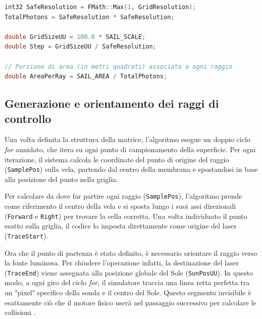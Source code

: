 \begin{lstlisting}[language=C++, caption={Impostazione della griglia di campionamento in \texttt{SolarSail.cpp}.}]
int32 SafeResolution = FMath::Max(1, GridResolution);
TotalPhotons = SafeResolution * SafeResolution;

double GridSizeUU = 100.0 * SAIL_SCALE; 
double Step = GridSizeUU / SafeResolution;

// Porzione di area (in metri quadrati) associata a ogni raggio
double AreaPerRay = SAIL_AREA / TotalPhotons;
\end{lstlisting}


\subsection{Generazione e orientamento dei raggi di controllo}

Una volta definita la struttura della matrice, l'algoritmo esegue un doppio ciclo \textit{for} annidato, che itera su ogni punto di campionamento della superficie. Per ogni iterazione, il sistema calcola le coordinate del punto di origine del raggio (\lstinline|SamplePos|) sulla vela, partendo dal centro della membrana e spostandosi in base alla posizione del punto nella griglia.

Per calcolare da dove far partire ogni raggio (\lstinline|SamplePos|), l'algoritmo prende come riferimento il centro della vela e si sposta lungo i suoi assi direzionali (\lstinline|Forward| e \lstinline|Right|) per trovare la cella corretta. Una volta individuato il punto esatto sulla griglia, il codice lo imposta direttamente come origine del laser (\lstinline|TraceStart|).

Ora che il punto di partenza è stato definito, è necessario orientare il raggio verso la fonte luminosa. Per chiudere l'operazione infatti, la destinazione del laser (\lstinline|TraceEnd|) viene assegnata alla posizione globale del Sole (\lstinline|SunPosUU|). In questo modo, a ogni giro del ciclo \textit{for}, il simulatore traccia una linea retta perfetta tra un "pixel" specifico della sonda e il centro del Sole. Questo segmento invisibile è esattamente ciò che il motore fisico userà nel passaggio successivo per calcolare le collisioni \cite{epicgames_unrealengine}.

